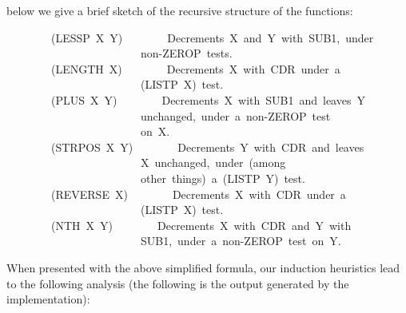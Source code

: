 \documentclass[10pt]{book}
\newenvironment{pubasis}{\begin{flushleft}}{\end{flushleft}}
\begin{document}
below we  give a brief sketch of the recursive structure of the
functions:
\begin{pubasis}
~~~~~~~~(LESSP~X~Y)~~~~~~~~Decrements~X~and~Y~with~SUB1,~under\\
~~~~~~~~~~~~~~~~~~~~~~~~non-ZEROP~tests.\\

~~~~~~~~(LENGTH~X)~~~~~~~~Decrements~X~with~CDR~under~a\\
~~~~~~~~~~~~~~~~~~~~~~~~(LISTP~X)~test.\\

~~~~~~~~(PLUS~X~Y)~~~~~~~~Decrements~X~with~SUB1~and~leaves~Y\\
~~~~~~~~~~~~~~~~~~~~~~~~unchanged,~under~a~non-ZEROP~test\\
~~~~~~~~~~~~~~~~~~~~~~~~on~X.\\

~~~~~~~~(STRPOS~X~Y)~~~~~~~~Decrements~Y~with~CDR~and~leaves\\
~~~~~~~~~~~~~~~~~~~~~~~~X~unchanged,~under~(among\\
~~~~~~~~~~~~~~~~~~~~~~~~other~things)~a~(LISTP~Y)~test.\\

~~~~~~~~(REVERSE~X)~~~~~~~~Decrements~X~with~CDR~under~a\\
~~~~~~~~~~~~~~~~~~~~~~~~(LISTP~X)~test.\\

~~~~~~~~(NTH~X~Y)~~~~~~~~Decrements~X~with~CDR~and~Y~with\\
~~~~~~~~~~~~~~~~~~~~~~~~SUB1,~under~a~non-ZEROP~test~on~Y.\\
\end{pubasis}
When presented with the above simplified formula, our induction
heuristics lead to the following analysis (the following is
the output generated by the implementation):
\end{document}
